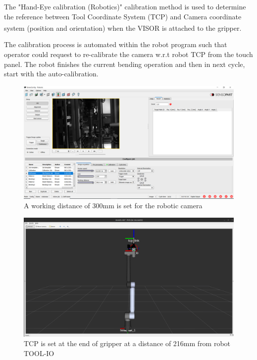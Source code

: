 The "Hand-Eye calibration (Robotics)" calibration method is used to determine the
reference between Tool Coordinate System (TCP) and Camera coordinate system
(position and orientation) when the VISOR\textsuperscript{\textregistered} is attached to the gripper.
\cite[page 102]{visor_user_manual}

The calibration process is automated within the robot program
such that operator could request to re-calibrate the camera w.r.t
robot TCP from the touch panel. The robot finishes the current
bending operation and then in next cycle, start with the auto-calibration.

\begin{figure}[h]
    \centering
    \includegraphics[width=\textwidth]{6. System Integration and Testing/6.2 Calibration Procedures/shutter_speed.PNG}
    \caption{A working distance of 300mm is set for the robotic camera}
    \label{fig:working-distance}
\end{figure}

\begin{figure}[h]
    \centering
    \includegraphics[width=\textwidth]{6. System Integration and Testing/6.2 Calibration Procedures/tcp.PNG}
    \caption{TCP is set at the end of gripper at a distance of 216mm from robot TOOL-IO}
    \label{fig:tcp}
\end{figure}


